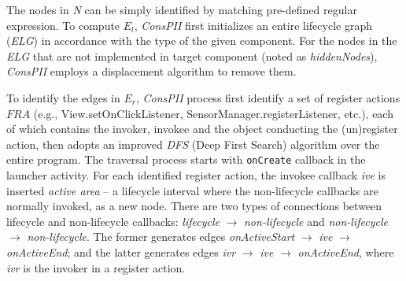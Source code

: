 The nodes in \textit{N} can be simply identified by matching pre-defined regular expression.
To compute $E_{l}$, \textit{ConsPII} first initializes an entire lifecycle graph (\textit{ELG}) in accordance with the type of the given component. 
For the nodes in the \textit{ELG} that are not implemented in target component (noted as \textit{hiddenNodes}), \textit{ConsPII} employs a displacement algorithm to remove them.


To identify the edges in $E_r$, \textit{ConsPII} process first identify a set of register actions $\mathit{FRA}$ (e.g., View.setOnClickListener, SensorManager.registerListener, etc.), each of which contains the invoker, invokee and the object conducting the (un)register action, then adopts an improved \textit{DFS} (Deep First Search) algorithm over the entire program. The traversal process starts with \texttt{onCreate} callback in the launcher activity. For each identified register action, the invokee callback \textit{ive} is inserted \textit{active area} -- a lifecycle interval where the non-lifecycle callbacks are normally invoked, as a new node. 
There are two types of connections between lifecycle and non-lifecycle callbacks: \textit{lifecycle} $\rightarrow $ \textit{non-lifecycle} and \textit{non-lifecycle} $\rightarrow $ \textit{non-lifecycle}. The former generates edges \textit{onActiveStart} $\rightarrow $ \textit{ive} $\rightarrow $ \textit{onActiveEnd}; and the latter generates edges \textit{ivr} $\rightarrow $ \textit{ive} $\rightarrow $ \textit{onActiveEnd}, where \textit{ivr} is the invoker in a register action. %


